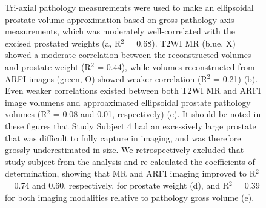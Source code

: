 \begin{figure}[htb!]
\begin{tabular}{ll}
\end{tabular}
\caption{Tri-axial pathology measurements were used to make an ellipsoidal
    prostate volume approximation based on gross pathology axis measurements,
    which was moderately well-correlated with the excised prostated weights (a,
    R$^2$ = 0.68).  T2WI MR (blue, X) showed a moderate correlation between the
    reconstructed volumes and prostate weight (R$^2$ = 0.44), while volumes
    reconstructed from ARFI images (green, O) showed weaker correlation (R$^2$
    = 0.21) (b).  Even weaker correlations existed between both T2WI MR and
    ARFI image volumens and approaximated ellipsoidal prostate pathology
    volumes (R$^2$ = 0.08 and 0.01, respectively) (c).  It should be noted in
    these figures that Study Subject 4 had an excessively large prostate that
    was difficult to fully capture in imaging, and was therefore grossly
    underestimated in size.  We retrospectively excluded that study subject
    from the analysis and re-calculated the coefficients of determination,
    showing that MR and ARFI imaging improved to R$^2$ = 0.74 and 0.60,
    respectively, for prostate weight (d), and R$^2$ = 0.39 for both imaging
    modalities relative to pathology gross volume (e).}
\label{fig:mr_arfi_weight}
\end{figure}
